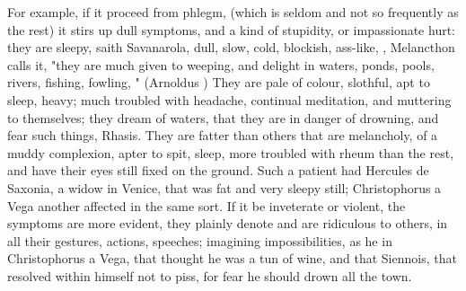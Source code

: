 {For example, if it proceed from phlegm, (which is seldom and not so frequently
as the rest) it stirs up dull symptoms, and a kind of
stupidity, or impassionate hurt: they are sleepy, saith
Savanarola, dull, slow, cold, blockish, ass-like,
, Melancthon calls it, "they are
much given to weeping, and delight in waters, ponds, pools, rivers, fishing,
fowling, \etc{}" (Arnoldus ) They
are pale of colour, slothful, apt to sleep, heavy;
much troubled with headache, continual meditation, and
muttering to themselves; they dream of waters, that they
are in danger of drowning, and fear such things, Rhasis. They are fatter than
others that are melancholy, of a muddy complexion, apter to spit,
sleep, more troubled with rheum than the rest, and have
their eyes still fixed on the ground. Such a patient had Hercules de Saxonia, a
widow in Venice, that was fat and very sleepy still; Christophorus a Vega
another affected in the same sort. If it be inveterate or violent, the symptoms
are more evident, they plainly denote and are ridiculous to others, in all
their gestures, actions, speeches; imagining impossibilities, as he in
Christophorus a Vega, that thought he was a tun of wine,
and that Siennois, that resolved within himself not to
piss, for fear he should drown all the town.

}
